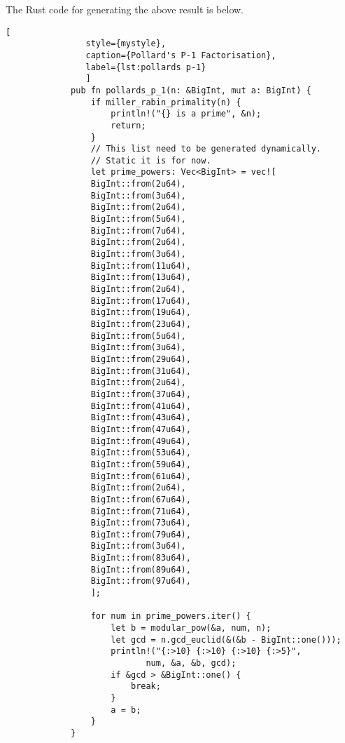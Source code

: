 \documentclass[11pt,a4paper,fleqn]{article}
\begin{document}
\begin{enumerate}[1.]
\begin{flushleft}
            The Rust code for generating the above result is below.
            \begin{lstlisting}[
                style={mystyle},
                caption={Pollard's P-1 Factorisation},
                label={lst:pollards p-1}
                ]
             pub fn pollards_p_1(n: &BigInt, mut a: BigInt) {
                 if miller_rabin_primality(n) {
                     println!("{} is a prime", &n);
                     return;
                 }
                 // This list need to be generated dynamically.
                 // Static it is for now.
                 let prime_powers: Vec<BigInt> = vec![
                 BigInt::from(2u64),
                 BigInt::from(3u64),
                 BigInt::from(2u64),
                 BigInt::from(5u64),
                 BigInt::from(7u64),
                 BigInt::from(2u64),
                 BigInt::from(3u64),
                 BigInt::from(11u64),
                 BigInt::from(13u64),
                 BigInt::from(2u64),
                 BigInt::from(17u64),
                 BigInt::from(19u64),
                 BigInt::from(23u64),
                 BigInt::from(5u64),
                 BigInt::from(3u64),
                 BigInt::from(29u64),
                 BigInt::from(31u64),
                 BigInt::from(2u64),
                 BigInt::from(37u64),
                 BigInt::from(41u64),
                 BigInt::from(43u64),
                 BigInt::from(47u64),
                 BigInt::from(49u64),
                 BigInt::from(53u64),
                 BigInt::from(59u64),
                 BigInt::from(61u64),
                 BigInt::from(2u64),
                 BigInt::from(67u64),
                 BigInt::from(71u64),
                 BigInt::from(73u64),
                 BigInt::from(79u64),
                 BigInt::from(3u64),
                 BigInt::from(83u64),
                 BigInt::from(89u64),
                 BigInt::from(97u64),
                 ];

                 for num in prime_powers.iter() {
                     let b = modular_pow(&a, num, n);
                     let gcd = n.gcd_euclid(&(&b - BigInt::one()));
                     println!("{:>10} {:>10} {:>10} {:>5}",
                            num, &a, &b, gcd);
                     if &gcd > &BigInt::one() {
                         break;
                     }
                     a = b;
                 }
             }

            \end{lstlisting}


\end{flushleft}
\end{enumerate}
\end{document}

